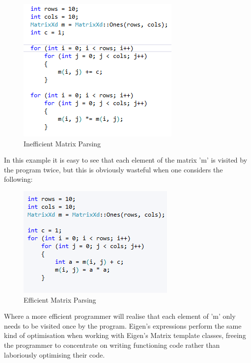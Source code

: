 \documentclass[a4paper]{amsart}
\begin{document}
\begin{figure}[h]
\centering
\includegraphics[scale=1.0]{Expressions1.png}
\caption {Inefficient Matrix Parsing}
\label {fig:Expr1}
\end{figure}

In this example it is easy to see that each element of the matrix 'm' is visited by the program twice, but this is obviously wasteful when one considers the following:\\


\begin{figure}[h]
\centering
\includegraphics[scale=1.0]{Expressions2.png}
\caption {Efficient Matrix Parsing}
\label {fig:Expr2}
\end{figure}



Where a more efficient programmer will realise that each element of 'm' only needs to be visited once by the program. Eigen's expressions perform the same kind of optimisation when working with Eigen's Matrix template classes, freeing the programmer to concentrate on writing functioning code rather than laboriously optimising their code.
\end{document}

